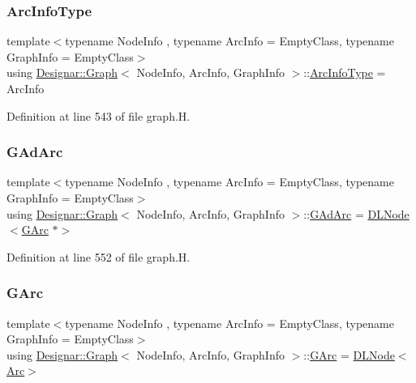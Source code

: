 \subsubsection{\texorpdfstring{Arc\+Info\+Type}{ArcInfoType}}
{\footnotesize\ttfamily template$<$typename Node\+Info , typename Arc\+Info  = Empty\+Class, typename Graph\+Info  = Empty\+Class$>$ \\
using \hyperlink{class_designar_1_1_graph}{Designar\+::\+Graph}$<$ Node\+Info, Arc\+Info, Graph\+Info $>$\+::\hyperlink{class_designar_1_1_graph_abc2adb4841a6d092d5093f9e60f2c8be}{Arc\+Info\+Type} =  Arc\+Info}



Definition at line 543 of file graph.\+H.

\mbox{\label{class_designar_1_1_graph_a7d00558995946c5653522148b54971bc}} 
\subsubsection{\texorpdfstring{G\+Ad\+Arc}{GAdArc}}
{\footnotesize\ttfamily template$<$typename Node\+Info , typename Arc\+Info  = Empty\+Class, typename Graph\+Info  = Empty\+Class$>$ \\
using \hyperlink{class_designar_1_1_graph}{Designar\+::\+Graph}$<$ Node\+Info, Arc\+Info, Graph\+Info $>$\+::\hyperlink{class_designar_1_1_graph_a7d00558995946c5653522148b54971bc}{G\+Ad\+Arc} =  \hyperlink{class_designar_1_1_d_l_node}{D\+L\+Node}$<$\hyperlink{class_designar_1_1_graph_a5ad9e18b71899c2d4979426e367e5573}{G\+Arc} $\ast$$>$\hspace{0.3cm}{\ttfamily [protected]}}



Definition at line 552 of file graph.\+H.

\mbox{\label{class_designar_1_1_graph_a5ad9e18b71899c2d4979426e367e5573}} 
\subsubsection{\texorpdfstring{G\+Arc}{GArc}}
{\footnotesize\ttfamily template$<$typename Node\+Info , typename Arc\+Info  = Empty\+Class, typename Graph\+Info  = Empty\+Class$>$ \\
using \hyperlink{class_designar_1_1_graph}{Designar\+::\+Graph}$<$ Node\+Info, Arc\+Info, Graph\+Info $>$\+::\hyperlink{class_designar_1_1_graph_a5ad9e18b71899c2d4979426e367e5573}{G\+Arc} =  \hyperlink{class_designar_1_1_d_l_node}{D\+L\+Node}$<$\hyperlink{class_designar_1_1_graph_a74c730ef4ce2d20f998d72bd25c2b5bf}{Arc}$>$\hspace{0.3cm}{\ttfamily [protected]}}



